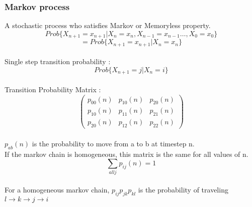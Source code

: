 \documentclass{article}
\begin{document}
	\subsubsection{Markov process}
	A stochastic process who satisfies Markov or Memoryless property. 
	\[Prob\{ X_{n+1} = x_{n+1} | X_n = x_n, X_{n-1} = x_{n-1} \ldots , X_0 = x_0 \}\]
	\[= Prob\{ X_{n+1} = x_{n+1} | X_n = x_n\}\]
	\\Single step transition probability :
	\[Prob\{X_{n+1} = j | X_n = i \}\]
	\\Transition Probability Matrix : 
	\[ \left( \begin{array}{ccc}
            p_{00}(n) & p_{10}(n) & p_{20}(n) \\
			p_{10}(n) & p_{11}(n) & p_{21}(n) \\
			p_{20}(n) & p_{12}(n) & p_{22}(n) 
	\end{array} \right)\] 
 	\\$p_{ab}(n)$ is the probability to move from a to b at timestep n.
 	\\If the markov chain is homogeneous, this matrix is the same for all values of n. 
	\\$$\sum\limits_{all j}{p_{ij}(n)} = 1$$
	\\For a homogeneous markov chain, $p_{ij} p_{jk} p_{kl}$ is the probability of traveling $l\rightarrow k\rightarrow j\rightarrow i$
	
 	 
\end{document}
